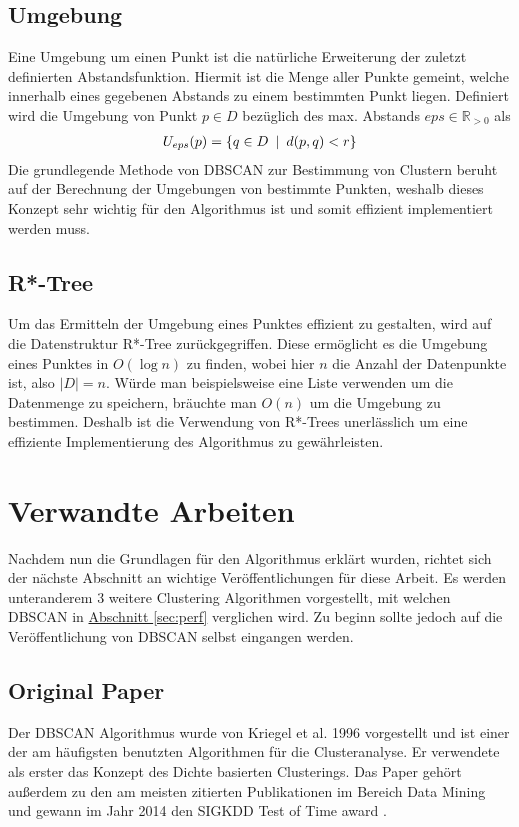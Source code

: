 \documentclass{lni}
\begin{document}
\subsection{Umgebung}
Eine Umgebung um einen Punkt ist die natürliche Erweiterung der zuletzt definierten Abstandsfunktion. Hiermit ist die Menge aller Punkte gemeint, welche innerhalb eines gegebenen Abstands zu einem bestimmten Punkt liegen.
Definiert wird die Umgebung von Punkt $p \in D$ bezüglich des max. Abstands $eps \in \mathbb{R}_{>0}$ als
\begin{align}
    U_{eps}(p) = \{ q \in D \enspace | \enspace d(p,q) < r \} \notag
\end{align}
Die grundlegende Methode von DBSCAN zur Bestimmung von Clustern beruht auf der Berechnung der Umgebungen von bestimmte Punkten, weshalb dieses Konzept sehr wichtig für den Algorithmus ist und somit effizient implementiert werden muss.


\subsection{R*-Tree}
Um das Ermitteln der Umgebung eines Punktes effizient zu gestalten, wird auf die Datenstruktur R*-Tree \cite{R*} zurückgegriffen. Diese ermöglicht es die Umgebung eines Punktes in $O(\log n)$ zu finden, wobei hier $n$ die Anzahl der Datenpunkte ist, also $|D| = n$. Würde man beispielsweise eine Liste verwenden um die Datenmenge zu speichern, bräuchte man $O(n)$ um die Umgebung zu bestimmen. Deshalb ist die Verwendung von R*-Trees unerlässlich um eine effiziente Implementierung des Algorithmus zu gewährleisten.

%
%

\section{Verwandte Arbeiten}
Nachdem nun die Grundlagen für den Algorithmus erklärt wurden, richtet sich der nächste Abschnitt an wichtige Veröffentlichungen für diese Arbeit. Es werden unteranderem 3 weitere Clustering Algorithmen vorgestellt, mit welchen DBSCAN in \hyperref[sec:perf]{Abschnitt \ref{sec:perf}} verglichen wird. Zu beginn sollte jedoch auf die Veröffentlichung von DBSCAN selbst eingangen werden.


\subsection{Original Paper}
Der DBSCAN Algorithmus wurde von Kriegel et al. 1996 vorgestellt \cite{DBSCAN} und ist einer der am häufigsten benutzten Algorithmen für die Clusteranalyse. Er verwendete als erster das Konzept des Dichte basierten Clusterings. Das Paper gehört außerdem zu den am meisten zitierten Publikationen im Bereich Data Mining und gewann im Jahr 2014 den \glqq SIGKDD Test of Time award \grqq{} \cite{TOTA}.
\end{document}
